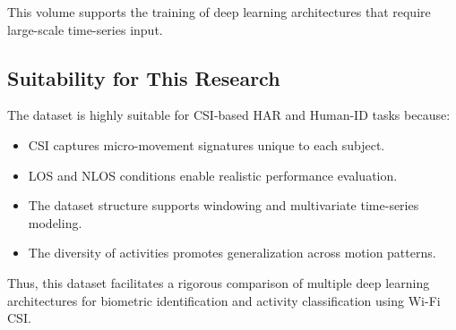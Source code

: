 This volume supports the training of deep learning architectures that require large-scale time-series input.

\subsection{Suitability for This Research}
The dataset is highly suitable for CSI-based HAR and Human-ID tasks because:
\begin{itemize}
    \item CSI captures micro-movement signatures unique to each subject.
    \item LOS and NLOS conditions enable realistic performance evaluation.
    \item The dataset structure supports windowing and multivariate time-series modeling.
    \item The diversity of activities promotes generalization across motion patterns.
\end{itemize}

Thus, this dataset facilitates a rigorous comparison of multiple deep learning architectures for biometric identification and activity classification using Wi-Fi CSI.


